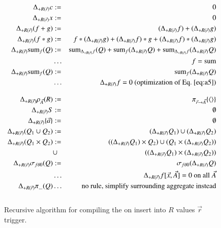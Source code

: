 \documentclass{article}
\newcommand{\tuple}[1]{{\langle#1\rangle}}
\begin{document}
\begin{figure*}
\begin{eqnarray}
\label{eq:a1}
\Delta_{+R(\vec{r})} c       &:=& 0 \\
\label{eq:a2}
\Delta_{+R(\vec{r})} x       &:=& 0 \\
\label{eq:a3}
\Delta_{+R(\vec{r})} (f + g) &:=& (\Delta_{+R(\vec{r})} f) + (\Delta_{+R(\vec{r})} g) \\
\label{eq:a4}
\Delta_{+R(\vec{r})} (f * g) &:=&         f                * (\Delta_{+R(\vec{r})} g)
                              +   (\Delta_{+R(\vec{r})} f) * g                        
                              +   (\Delta_{+R(\vec{r})} f) * (\Delta_{+R(\vec{r})} g)
\\
\label{eq:a5}
\Delta_{+R(\vec{r})} \algsum_f(Q) &:=&
   \algsum_{\Delta_{+R(\vec{r})} f}(Q)
   + \algsum_f(\Delta_{+R(\vec{r})} Q)
   + \algsum_{\Delta_{+R(\vec{r})} f}(\Delta_{+R(\vec{r})} Q)
\\
\nonumber
&\dots& \mbox{$f = \algsum$}
\\
\label{eq:a6}
\Delta_{+R(\vec{r})} \algsum_f(Q) &:=&
   \algsum_f(\Delta_{+R(\vec{r})} Q)
\\
\nonumber
&\dots& \mbox{$\Delta_{+R(\vec{r})} f = 0$ (optimization of Eq.~\ref{eq:a5})}
%
%
\\[2ex]
\label{eq:b1}
\Delta_{+R(\vec{r})} \rho_{\vec{A}}(R) &:=& \pi_{\vec{r} \rightarrow \vec{A}}\{\tuple{}\}
\\
\label{eq:b2}
\Delta_{+R(\vec{r})} S &:=& \emptyset
\\
\label{eq:b3}
\Delta_{+R(\vec{r})} \{ \vec{a} \} &:=& \emptyset
\\
\label{eq:b4}
\Delta_{+R(\vec{r})} (Q_1 \cup Q_2) &:=&
(\Delta_{+R(\vec{r})} Q_1) \cup (\Delta_{+R(\vec{r})} Q_2)
\\
\label{eq:b5}
\Delta_{+R(\vec{r})} (Q_1 \times Q_2) &:=&
((\Delta_{+R(\vec{r})} Q_1) \times Q_2) \cup
(Q_1 \times (\Delta_{+R(\vec{r})} Q_2)) \\
\nonumber
&\cup&
((\Delta_{+R(\vec{r})} Q_1) \times (\Delta_{+R(\vec{r})} Q_2))
\\
\label{eq:b6}
\Delta_{+R(\vec{r})} \sigma_{f \theta 0}(Q) &:=&
\sigma_{f \theta 0}(\Delta_{+R(\vec{r})} Q)
\\
\nonumber
&\dots& \Delta_{+R(\vec{r})} f[\vec{x}, \vec{A}] = 0 \mbox{ on all $\vec{A}$}
\\
\nonumber
\Delta_{+R(\vec{r})} \pi_{\dots}(Q) &\dots& \mbox{no rule, simplify 
surrounding aggregate instead}
\\[2ex]
%
%
\end{eqnarray}

\vspace{-4mm}

\caption{Recursive algorithm for compiling the
on insert into $R$ values $\vec{r}$ trigger.}
\label{fig:mainalg}
\end{figure*}
\end{document}
